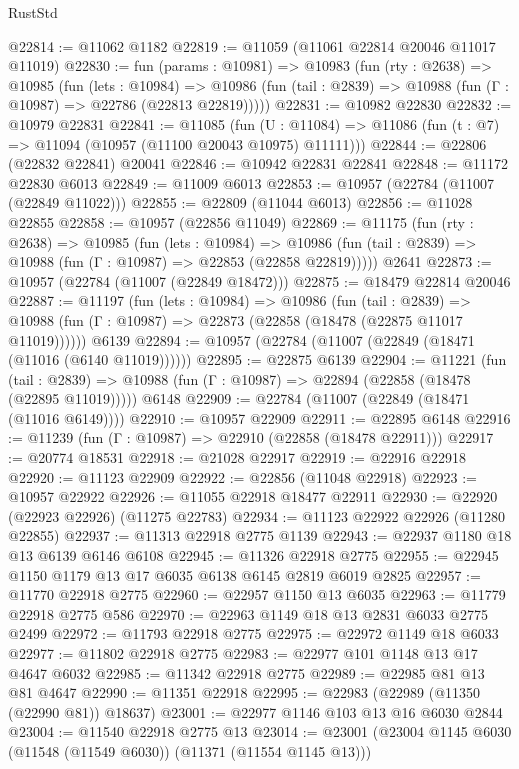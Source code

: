 \begin{lexlean}{RustStd}
\begin{coremodule}
@22814 := @11062 @1182
@22819 := @11059 (@11061 @22814 @20046 @11017 @11019)
@22830 := fun (params : @10981) =>
  @10983
    (fun (rty : @2638) =>
    @10985
      (fun (lets : @10984) =>
      @10986 (fun (tail : @2839) => @10988 (fun (Γ : @10987) => @22786 (@22813 @22819)))))
@22831 := @10982 @22830
@22832 := @10979 @22831
@22841 := @11085
    (fun (U : @11084) => @11086 (fun (t : @7) => @11094 (@10957 (@11100 @20043 @10975) @11111)))
@22844 := @22806 (@22832 @22841) @20041
@22846 := @10942 @22831 @22841
@22848 := @11172 @22830 @6013
@22849 := @11009 @6013
@22853 := @10957 (@22784 (@11007 (@22849 @11022)))
@22855 := @22809 (@11044 @6013)
@22856 := @11028 @22855
@22858 := @10957 (@22856 @11049)
@22869 := @11175
    (fun (rty : @2638) =>
    @10985
      (fun (lets : @10984) =>
      @10986 (fun (tail : @2839) => @10988 (fun (Γ : @10987) => @22853 (@22858 @22819)))))
    @2641
@22873 := @10957 (@22784 (@11007 (@22849 @18472)))
@22875 := @18479 @22814 @20046
@22887 := @11197
    (fun (lets : @10984) =>
    @10986
      (fun (tail : @2839) =>
      @10988 (fun (Γ : @10987) => @22873 (@22858 (@18478 (@22875 @11017 @11019))))))
    @6139
@22894 := @10957 (@22784 (@11007 (@22849 (@18471 (@11016 (@6140 @11019))))))
@22895 := @22875 @6139
@22904 := @11221
    (fun (tail : @2839) => @10988 (fun (Γ : @10987) => @22894 (@22858 (@18478 (@22895 @11019)))))
    @6148
@22909 := @22784 (@11007 (@22849 (@18471 (@11016 @6149))))
@22910 := @10957 @22909
@22911 := @22895 @6148
@22916 := @11239 (fun (Γ : @10987) => @22910 (@22858 (@18478 @22911)))
@22917 := @20774 @18531
@22918 := @21028 @22917
@22919 := @22916 @22918
@22920 := @11123 @22909
@22922 := @22856 (@11048 @22918)
@22923 := @10957 @22922
@22926 := @11055 @22918 @18477 @22911
@22930 := @22920 (@22923 @22926) (@11275 @22783)
@22934 := @11123 @22922 @22926 (@11280 @22855)
@22937 := @11313 @22918 @2775 @1139
@22943 := @22937 @1180 @18 @13 @6139 @6146 @6108
@22945 := @11326 @22918 @2775
@22955 := @22945 @1150 @1179 @13 @17 @6035 @6138 @6145 @2819 @6019 @2825
@22957 := @11770 @22918 @2775
@22960 := @22957 @1150 @13 @6035
@22963 := @11779 @22918 @2775 @586
@22970 := @22963 @1149 @18 @13 @2831 @6033 @2775 @2499
@22972 := @11793 @22918 @2775
@22975 := @22972 @1149 @18 @6033
@22977 := @11802 @22918 @2775
@22983 := @22977 @101 @1148 @13 @17 @4647 @6032
@22985 := @11342 @22918 @2775
@22989 := @22985 @81 @13 @81 @4647
@22990 := @11351 @22918
@22995 := @22983 (@22989 (@11350 (@22990 @81)) @18637)
@23001 := @22977 @1146 @103 @13 @16 @6030 @2844
@23004 := @11540 @22918 @2775 @13
@23014 := @23001 (@23004 @1145 @6030 (@11548 (@11549 @6030)) (@11371 (@11554 @1145 @13)))

\end{coremodule}
\end{lexlean}
